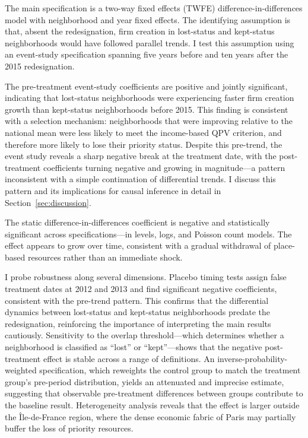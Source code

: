 \documentclass[12pt]{article}
\begin{document}
The main specification is a two-way fixed effects (TWFE) difference-in-differences model with neighborhood and year fixed effects. The identifying assumption is that, absent the redesignation, firm creation in lost-status and kept-status neighborhoods would have followed parallel trends. I test this assumption using an event-study specification spanning five years before and ten years after the 2015 redesignation.

The pre-treatment event-study coefficients are positive and jointly significant, indicating that lost-status neighborhoods were experiencing faster firm creation growth than kept-status neighborhoods before 2015. This finding is consistent with a selection mechanism: neighborhoods that were improving relative to the national mean were less likely to meet the income-based QPV criterion, and therefore more likely to lose their priority status. Despite this pre-trend, the event study reveals a sharp negative break at the treatment date, with the post-treatment coefficients turning negative and growing in magnitude---a pattern inconsistent with a simple continuation of differential trends. I discuss this pattern and its implications for causal inference in detail in Section~\ref{sec:discussion}.

The static difference-in-differences coefficient is negative and statistically significant across specifications---in levels, logs, and Poisson count models. The effect appears to grow over time, consistent with a gradual withdrawal of place-based resources rather than an immediate shock.

I probe robustness along several dimensions. Placebo timing tests assign false treatment dates at 2012 and 2013 and find significant negative coefficients, consistent with the pre-trend pattern. This confirms that the differential dynamics between lost-status and kept-status neighborhoods predate the redesignation, reinforcing the importance of interpreting the main results cautiously. Sensitivity to the overlap threshold---which determines whether a neighborhood is classified as ``lost'' or ``kept''---shows that the negative post-treatment effect is stable across a range of definitions. An inverse-probability-weighted specification, which reweights the control group to match the treatment group's pre-period distribution, yields an attenuated and imprecise estimate, suggesting that observable pre-treatment differences between groups contribute to the baseline result. Heterogeneity analysis reveals that the effect is larger outside the \^Ile-de-France region, where the dense economic fabric of Paris may partially buffer the loss of priority resources.
\end{document}
